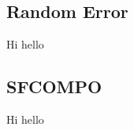 
\subsection{Random Error}
\label{sec:randerr}
Hi hello

\subsection{SFCOMPO}
\label{sec:sfcompo}
Hi hello
